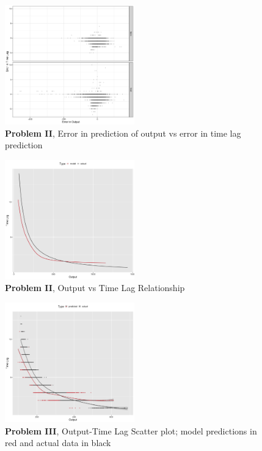 \documentclass[twoside]{article}
\begin{document}
\begin{figure}[h]
\vspace{.3in}
\centerline{\includegraphics[width=0.5\textwidth]{figures/exp2_scatter_errors_test.png}}
\vspace{.3in}
\caption{\textbf{Problem II}, Error in prediction of output vs error in time lag prediction}
\label{fig:problem2_error}
\end{figure}

\begin{figure}[h]
\vspace{.3in}
\centerline{\includegraphics[width=0.5\textwidth]{figures/exp2_predictive_curves.png}}
\vspace{.3in}
\caption{\textbf{Problem II}, Output vs Time Lag Relationship}
\label{fig:problem2_curves}
\end{figure}



\begin{figure}[h]
\vspace{.3in}
\centerline{\includegraphics[width=0.5\textwidth]{figures/exp3_scatter_v_tl.png}}
\vspace{.3in}
\caption{\textbf{Problem III}, Output-Time Lag Scatter plot; model predictions in red and actual data in black}
\end{figure}
\end{document}
